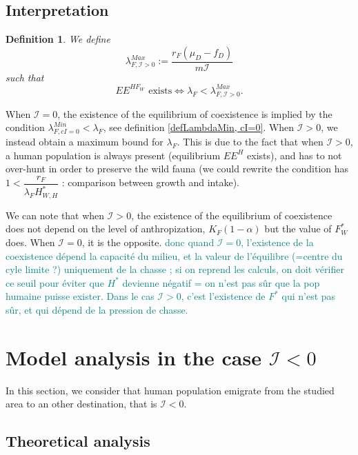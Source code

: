\documentclass{article}
\newcommand{\lfw}{\lambda_{F}}
\newcommand{\lfw}{\lambda_{F}}
\newcommand{\cI}{\mathcal{I}}
\newcommand{\marc}[1]{\textcolor{teal}{#1}}
\newtheorem{definition}{Definition}
\begin{document}
\subsection{Interpretation}

\begin{definition}
We define 
$$\lambda_{F, \cI>0}^{Max} := \dfrac{r_F(\mu_D - f_D)}{m \cI}$$
such that 
$$
\text{$EE^{HF_W}$ exists} \Leftrightarrow  \lfw < \lambda_{F, \cI>0}^{Max}.
$$
\end{definition}

When $\cI = 0$, the existence of the equilibrium of coexistence is implied by the condition $\lambda_{F, cI = 0}^{Min} < \lfw$, see definition \ref{defLambdaMin, cI=0}. When $\cI > 0$, we instead obtain a maximum bound for $\lfw$. This is due to the fact that when $\cI > 0$, a human population is always present (equilibrium $EE^{H}$ exists), and has to not over-hunt in order to preserve the wild fauna (we could rewrite the condition has $1 < \dfrac{r_F}{\lfw H^*_{W, H}}$ : comparison between growth and intake).


We can note that when $\cI > 0$, the existence of the equilibrium of coexistence does not depend on the level of anthropization, $K_F(1-\alpha)$ but the value of $F^*_W$ does. When $\cI = 0$, it is the opposite. 
\marc{donc quand $\cI =0$, l'existence de la coexistence dépend la capacité du milieu, et la valeur de l'équilibre (=centre du cyle limite ?) uniquement de la chasse ; si on reprend les calculs, on doit vérifier ce seuil pour éviter que $H^*$ devienne négatif = on n'est pas sûr que la pop humaine puisse exister. Dans le cas $\cI > 0$, c'est l'existence de $F^*$ qui n'est pas sûr, et qui dépend de la pression de chasse.}




\section{Model analysis in the case $\cI < 0$}

In this section, we consider that human population emigrate from the studied area to an other destination, that is $\cI < 0$.

\subsection{Theoretical analysis}
\end{document}
